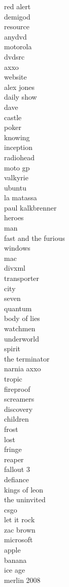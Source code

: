 \begin{multicols}{5}
	red alert\\
	demigod\\
	resource\\
	anydvd\\
	motorola\\
	dvdsrc\\
	axxo\\
	website\\
	alex jones\\
	daily show\\
	dave\\
	castle\\
	poker\\
	knowing\\
	inception\\
	radiohead\\
	moto gp\\
	valkyrie\\
	ubuntu\\
	la matassa\\
	paul kalkbrenner\\
	heroes\\
	man\\
	fast and the furious\\
	windows\\
	mac\\
	divxml\\
	transporter\\
	city\\
	seven\\
	quantum\\
	body of lies\\
	watchmen\\
	underworld\\
	spirit\\
	the terminator\\
	narnia axxo\\
	tropic\\
	fireproof\\
	screamers\\
	discovery\\
	children\\
	frost\\
	lost\\
	fringe\\
	reaper\\
	fallout 3\\
	defiance\\
	kings of leon\\
	the uninvited\\
	csgo\\
	let it rock\\
	zac brown\\
	microsoft\\
	apple\\
	banana\\
	ice age\\
	merlin 2008\\
	
\end{multicols}

